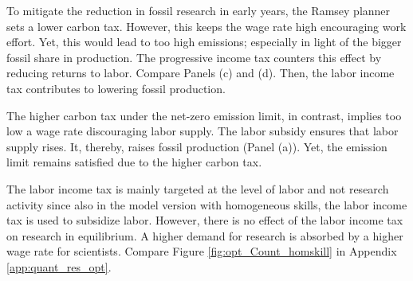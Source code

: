 To mitigate the reduction in fossil research in early years, the Ramsey planner sets a lower carbon tax. However, this keeps the wage rate high encouraging work effort. Yet, this would lead to too high emissions; especially in light of the bigger fossil share in production. The progressive income tax counters this effect by reducing returns to labor. Compare Panels (c) and (d). Then, the labor income tax contributes to lowering fossil production. 

The higher carbon tax under the net-zero emission limit, in contrast, implies too low a wage rate discouraging labor supply. The labor subsidy ensures that labor supply rises. It, thereby, raises fossil production (Panel (a)). Yet, the emission limit remains satisfied due to the higher carbon tax. 

The labor income tax is mainly targeted at the level of labor and not research activity since also in the model version with homogeneous skills, the labor income tax is used to subsidize labor. However, there is no effect of the labor income tax on research in equilibrium. A higher demand for research is absorbed by a higher wage rate for scientists. Compare Figure \ref{fig:opt_Count_homskill} in Appendix \ref{app:quant_res_opt}. 

 
 
 
 
 
